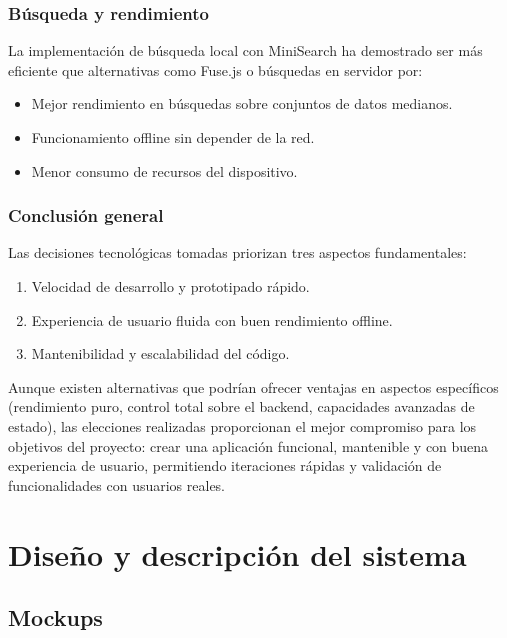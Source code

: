 \documentclass[twoside, openright, 11pt]{report}
\begin{document}
\begin{enumerate}
	\subsection*{Búsqueda y rendimiento}
	La implementación de búsqueda local con MiniSearch ha demostrado ser más eficiente que alternativas como Fuse.js o búsquedas en servidor por:
	\begin{itemize}
		\item Mejor rendimiento en búsquedas sobre conjuntos de datos medianos.
		\item Funcionamiento offline sin depender de la red.
		\item Menor consumo de recursos del dispositivo.
	\end{itemize}
	
	\subsection*{Conclusión general}
	Las decisiones tecnológicas tomadas priorizan tres aspectos fundamentales:
	\begin{enumerate}
		\item Velocidad de desarrollo y prototipado rápido.
		\item Experiencia de usuario fluida con buen rendimiento offline.
		\item Mantenibilidad y escalabilidad del código.
	\end{enumerate}
	
	Aunque existen alternativas que podrían ofrecer ventajas en aspectos específicos (rendimiento puro, control total sobre el backend, capacidades avanzadas de estado), las elecciones realizadas proporcionan el mejor compromiso para los objetivos del proyecto: crear una aplicación funcional, mantenible y con buena experiencia de usuario, permitiendo iteraciones rápidas y validación de funcionalidades con usuarios reales.

\chapter{Diseño y descripción del sistema}\label{cap.diseno y descripcion del sistema} %
  \section{Mockups}
  

\end{enumerate}
\end{document}
